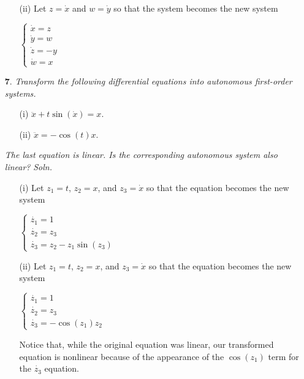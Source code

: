 \documentclass{article}
\begin{document}
\begin{itemize}
\begin{itemize}
        \item[(ii)] Let $z = \dot{x}$ and $w = \dot{y}$ so that the system becomes the new system
        \begin{center}
            $\begin{cases}
                \dot{x} = z\\
                \dot{y} = w\\
                \dot{z} = -y\\
                \dot{w} = x
            \end{cases}$
        \end{center}
    \end{itemize}
    \newpage


    \item[\textbf{7}.] \textit{Transform the following differential equations into autonomous first-order systems.}
    \begin{itemize}
        \item[(i)] $\ddot{x} + t\sin(\dot{x}) = x$.

        \item[(ii)] $\ddot{x} = -\cos(t)x$.
    \end{itemize}
    \textit{The last equation is linear. Is the corresponding autonomous system also linear?}
    \newline\newline
    \textit{Soln.}
    \begin{itemize}
        \item[(i)] Let $z_1 = t$, $z_2 = x$, and $z_3 = \dot{x}$ so that the equation becomes the new system
        \begin{center}
            $\begin{cases}
                \dot{z_1} = 1\\
                \dot{z_2} = z_3\\
                \dot{z_3} = z_2 - z_1\sin(z_3)
            
            \end{cases}$
        \end{center}

        \item[(ii)] Let $z_1 = t$, $z_2 = x$, and $z_3 = \dot{x}$ so that the equation becomes the new system
        \begin{center}
            $\begin{cases}
                \dot{z_1} = 1\\
                \dot{z_2} = z_3\\
                \dot{z_3} = -\cos(z_1)z_2
            \end{cases}$
        \end{center}
        Notice that, while the original equation was linear, our transformed equation is nonlinear because of the appearance of the $\cos(z_1)$ term for the $\dot{z_3}$ equation.
    \end{itemize}
    
\end{itemize}
\end{document}
